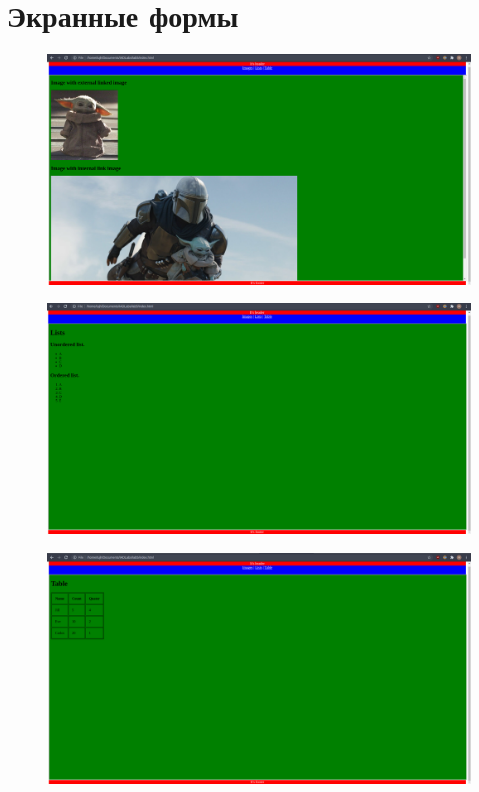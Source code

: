 \documentclass[20pt,a4paper]{report}
\begin{document}
	\chapter{Экранные формы}
		\begin{figure}[H]
			\includegraphics[width=\textwidth]{1.png}
		\end{figure}
		\begin{figure}[H]
			\includegraphics[width=\textwidth]{2.png}
		\end{figure}
		\begin{figure}[H]
			\includegraphics[width=\textwidth]{3.png}
		\end{figure}
\end{document}
